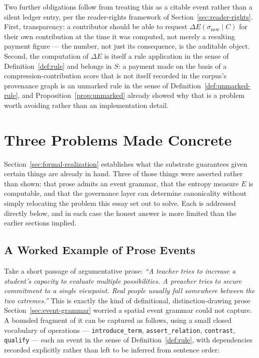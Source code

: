 \documentclass[11pt]{article}
\theoremstyle{definition}
\begin{document}
Two further obligations follow from treating this as a citable event rather than a silent ledger entry, per the reader-rights framework of Section~\ref{sec:reader-rights}. First, transparency: a contributor should be able to request $\Delta E(\sigma_{\mathrm{new}} \mid C)$ for their own contribution at the time it was computed, not merely a resulting payment figure --- the number, not just its consequence, is the auditable object. Second, the computation of $\Delta E$ is itself a rule application in the sense of Definition~\ref{def:rule} and belongs in $S$: a payment made on the basis of a compression-contribution score that is not itself recorded in the corpus's provenance graph is an unmarked rule in the sense of Definition~\ref{def:unmarked-rule}, and Proposition~\ref{prop:unmarked} already showed why that is a problem worth avoiding rather than an implementation detail.

\section{Three Problems Made Concrete}
\label{sec:three-problems}

Section~\ref{sec:formal-realization} establishes what the substrate guarantees given certain things are already in hand. Three of those things were asserted rather than shown: that prose admits an event grammar, that the entropy measure $E$ is computable, and that the governance layer can determine canonicality without simply relocating the problem this essay set out to solve. Each is addressed directly below, and in each case the honest answer is more limited than the earlier sections implied.

\subsection{A Worked Example of Prose Events}
\label{sec:worked-example}

Take a short passage of argumentative prose: \emph{``A teacher tries to increase a student's capacity to evaluate multiple possibilities. A preacher tries to secure commitment to a single viewpoint. Real people usually fall somewhere between the two extremes.''} This is exactly the kind of definitional, distinction-drawing prose Section~\ref{sec:event-grammar} worried a spatial event grammar could not capture. A bounded fragment of it can be captured as follows, using a small closed vocabulary of operations --- \texttt{introduce\_term}, \texttt{assert\_relation}, \texttt{contrast}, \texttt{qualify} --- each an event in the sense of Definition~\ref{def:rule}, with dependencies recorded explicitly rather than left to be inferred from sentence order:
\end{document}
